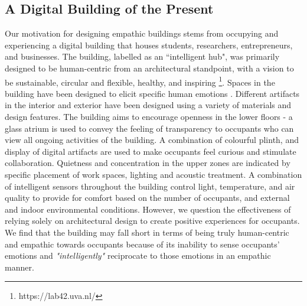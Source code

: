 \documentclass [sigconf] {acmart}
\begin{document}
\subsection{A Digital Building of the Present}
\label{subsec:building}
Our motivation for designing empathic buildings stems from occupying and experiencing a digital building that houses students, researchers, entrepreneurs, and businesses. The building, labelled as an ``intelligent hub", was primarily designed to be human-centric from an architectural standpoint, with a vision to be sustainable, circular and flexible, healthy, and inspiring \footnote{https://lab42.uva.nl/}. Spaces in the building have been designed to elicit specific human emotions \cite{silo_michiel_2022}. Different artifacts in the interior and exterior have been designed using a variety of materials and design features. The building aims to encourage openness in the lower floors - a glass atrium is used to convey the feeling of transparency to occupants who can view all ongoing activities of the building. A combination of colourful plinth, and display of digital artifacts are used to make occupants feel curious and stimulate collaboration. Quietness and concentration in the upper zones are indicated by specific placement of work spaces, lighting and acoustic treatment. A combination of intelligent sensors throughout the building control light, temperature, and air quality to provide for comfort based on the number of occupants, and external and indoor environmental conditions. However, we question the effectiveness of relying solely on architectural design to create positive experiences for occupants. We find that the building may fall short in terms of being truly human-centric and empathic towards occupants because of its inability to sense occupants' emotions and \textit{"intelligently"} reciprocate to those emotions in an empathic manner.
\end{document}
